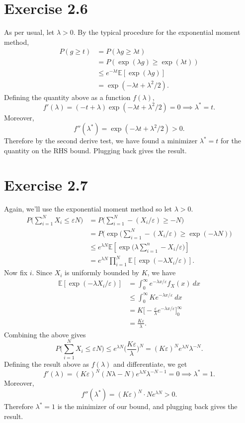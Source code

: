 \newpage
\section*{Exercise 2.6}
As per usual, let $\lambda > 0$. By the typical procedure for the exponential moment method, 
\begin{align*}
	P(g \geq t) 
	&= P(\lambda g \geq \lambda t) \\
	&= P(\exp{(\lambda g)} \geq \exp{(\lambda t)}) \\
	&\leq e^{-\lambda t} \mathbb{E}[\exp{(\lambda g)}] \\
	&= \exp{(-\lambda t + \lambda^2 / 2)}.
\end{align*}
Defining the quantity above as a function $f(\lambda)$, 
\[ f'(\lambda) = (-t + \lambda)\exp{(-\lambda t + \lambda^2 / 2)} = 0 \implies \lambda^* = t. \]
Moreover, 
\[ f''(\lambda^*) = \exp{(-\lambda t + \lambda^2 / 2)} > 0. \]
Therefore by the second derive test, we have found a minimizer $\lambda^* = t$ for the quantity on the 
RHS bound. Plugging back gives the result.


\newpage
\section*{Exercise 2.7}
Again, we'll use the exponential moment method so let $\lambda > 0$. 
\begin{align*}
	P \biggl( \sum_{i = 1}^{N} X_i \leq \varepsilon N \biggr) 
	&= P \biggl( \sum_{i = 1}^{N} -(X_i / \varepsilon) \geq -N \biggr) \\
	&= P \biggl( \exp{\biggl( \sum_{i = 1}^{N} -(X_i / \varepsilon)} \geq 
	\exp{(- \lambda N)} \biggr) \\
	&\leq e^{\lambda N} \mathbb{E}[\exp{\biggl( \lambda \sum_{i = 1}^{n} -X_i / \varepsilon \biggr)}] \\
	&= e^{\lambda N} \prod_{i = 1}^{N} \mathbb{E}[\exp{(-\lambda X_i / \varepsilon)}].
\end{align*}
Now fix $i$. Since $X_i$ is uniformly bounded by $K$, we have 
\begin{align*}
	\mathbb{E}[\exp{(-\lambda X_i / \varepsilon)}] 
	&= \int_{0}^{\infty} e^{-\lambda x / \varepsilon} f_X(x) \ dx \\
	&\leq \int_{0}^{\infty} Ke^{-\lambda x / \varepsilon} \ dx \\
	&= K \biggl[ -\frac{\varepsilon}{\lambda} e^{-\lambda x / \varepsilon} \biggr]_0^\infty \\
	&= \frac{K \varepsilon}{\lambda}.
\end{align*}
Combining the above gives 
\[ P \biggl( \sum_{i = 1}^{N} X_i  \leq \varepsilon N \biggr) \leq e^{\lambda N} 
\biggl( \frac{K \varepsilon}{\lambda} \biggr)^N = (K \varepsilon)^N e^{\lambda N} \lambda^{-N}. \]
Defining the result above as $f(\lambda)$ and differentiate, we get 
\[ f'(\lambda) = (K \varepsilon)^N (N \lambda - N) e^{\lambda N} \lambda^{-N - 1} = 0 
\implies \lambda^* = 1. \]
Moreover, 
\[ f''(\lambda^*) = (K \varepsilon)^N \cdot Ne^{\lambda N} > 0. \]
Therefore $\lambda^* = 1$ is the minimizer of our bound, and plugging back gives the result.



